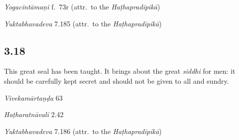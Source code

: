 \begin{ekdosis}
\begin{testimonia}[hp03_017]
\emph{Yogacintāmaṇi} f.~73r (attr.~to the \emph{Haṭhapradīpikā})
\begin{versinnote}
\end{versinnote}

\emph{Yuktabhavadeva} 7.185 (attr.~to the \emph{Haṭhapradīpikā})
\begin{versinnote}
\end{versinnote}
\end{testimonia}


\subsection*{3.18}
\begin{translation}[hp03_018]
This great seal has been taught. It brings about the great \emph{siddhi} for men: it should be carefully kept secret and should not be given to all and sundry.
\end{translation}

\begin{sources}[hp03_018]
\emph{Vivekamārtaṇḍa} 63
\begin{versinnote}
\end{versinnote}
\end{sources}

\begin{testimonia}[hp03_018]
\emph{Haṭharatnāvalī} 2.42
\begin{versinnote}
\end{versinnote}

\emph{Yuktabhavadeva} 7.186 (attr.~to the \emph{Haṭhapradīpikā})
\begin{versinnote}
\end{versinnote}
\end{testimonia}


\end{ekdosis}
